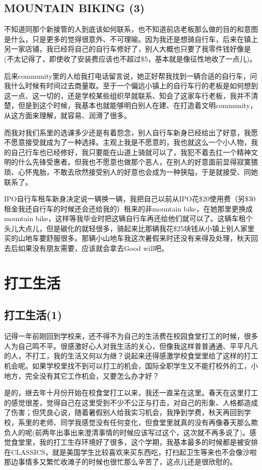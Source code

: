 \documentclass[12pt]{book}
\begin{document}
\section{MOUNTAIN BIKING (3)}
\label{sec-16-3}

不知道同那个新接管的人到底该如何联系，也不知道前店老板那么做的目的和意图是什么，只是更多的觉得很意外、不可理喻。因为我还是想骑自行车，后来在镇上另一家店铺，我已经将自己的自行车修好了，别人大概也只要了我零件钱好像是(不太记得了，即使收了安装费应该也不超过\$5，基本就是像征性地收了一点儿)。

后来community里的人给我打电话留言说，她正好帮我找到一辆合适的自行车，问我什么时候有时间过去商量取。至于一个偏远小镇上的自行车行的老板是如何想到这一点、这一切的，还是学校某些组织早就联系、知会了这家车行老板，我并不清楚，但是到这个时候，我基本也就能够明白别人在建、在打造着文明community，从这方面来理解，就容易、润滑了很多。

而我对我们系里的选课多少还是有着怨念，别人自行车新身已经给出了好意，我愿不愿意接受就成为了一种选择。主观上我是不愿意的，我也就这么一个小人物，我的自己行车也已经修好，我只要能在山道上骑就可以了，我犯不着去扛一个精神文明的什么先锋受惠者。但我也不愿意也做那个恶人，在别人的好意面前显得寂寞猥琐、心怀鬼胎，不敢去欣然接受别人的好意也会成为一种狭隘，于是就接受、同她联系了。

IPO自行车租车新身决定说一辆换一辆，我把自己以前从IPO花\$20使用费（另\$30租金我还自行车的时候还会还给我的）租来的非mountain bike，在她那里更换成mountain bike，这样等我毕业时把这辆自行车再还给他们就可以了。这辆车租个头儿大点儿，但是碳化的就轻很多，骑起来比那辆我花\$25块钱从小镇上别人家里买的山地车要舒服很多。那辆小山地车我这次暑假来时还没有来得及处理，秋天回去后如果没有朋友需要，应该就会拿去Good will吧。

\chapter{打工生活}
\label{sec-17}
\section{打工生活(1)}
\label{sec-17-1}
记得一年前刚回到学校来，还不得不为自己的生活费在校园食堂打工的时候，很多人为自己鸣不平。很感激好心人对我生活的关心，但像我这样普普通通、平平凡凡的人，不打工，我的生活又何以为继？说起来还得感激学校食堂里给了这样的打工机会呢。如果学校里找不到可以打工的机会，国际全职学生又不能打校外的工，小地方，完全没有其它工作机会，又要怎么办才好？

是的，继去年十月份开始在校食堂打工以来，我还一直呆在这里。春天在这里打工的感觉很差，觉得自己在这里受到不少不公正与打击，对自己的形象、人格都造成了伤害；但凭良心说，随着暑假别人给我实习机会，我挣到学费，秋天再回到学校，系里的老师、同学我感觉没有任何变化，但食堂里就真的没有再像春天那么欺负人的呢(前两年出事出来澄清事情的时候应该写过这个，这次就不再多说了)。感觉食堂里，我的打工生存环境好了很多，这个学期，我基本最多的时候都是被安排在CLASSICS，就是美国学生比较喜欢来买东西吃，打扫起卫生等来也不会像沙啦那边事情多又繁忙收滩子的时候也很忙那么辛苦了，这点儿还是很欣慰的。
\end{document}
